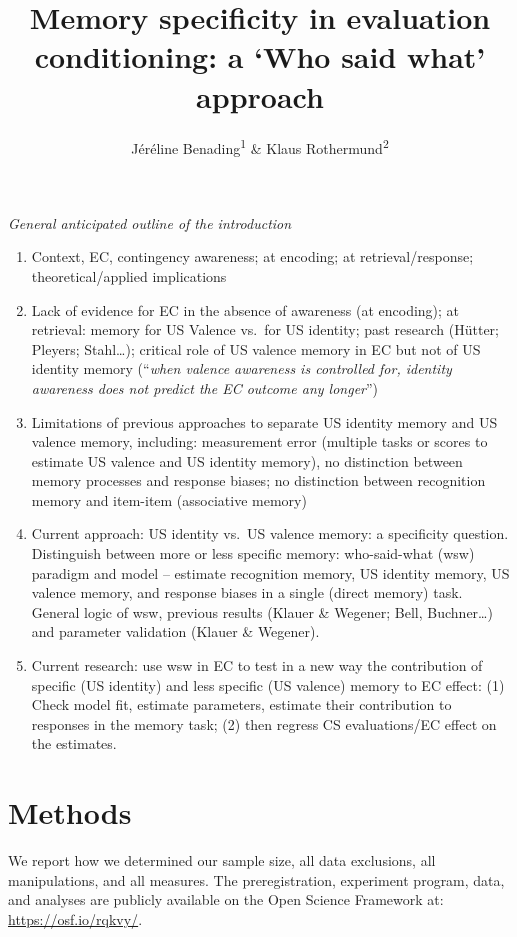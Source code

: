 \documentclass[
  man,floatsintext]{apa6}
\title{Memory specificity in evaluation conditioning: a `Who said what' approach}
\author{Jéréline Benading\textsuperscript{1} \& Klaus Rothermund\textsuperscript{2}}
\date{}
\affiliation{\vspace{0.5cm}\textsuperscript{1} Université Agnostique de Louvain-la-Jena\\\textsuperscript{2} Friedrich Schiller University Jena}
\begin{document}
\maketitle

\emph{General anticipated outline of the introduction}

\begin{enumerate}
\def\labelenumi{\arabic{enumi}.}
\item
  Context, EC, contingency awareness; at encoding; at retrieval/response; theoretical/applied implications
\item
  Lack of evidence for EC in the absence of awareness (at encoding); at retrieval: memory for US Valence vs.~for US identity; past research (Hütter; Pleyers; Stahl\ldots); critical role of US valence memory in EC but not of US identity memory (``\emph{when valence awareness is controlled for, identity awareness does not predict the EC outcome any longer}'')
\item
  Limitations of previous approaches to separate US identity memory and US valence memory, including: measurement error (multiple tasks or scores to estimate US valence and US identity memory), no distinction between memory processes and response biases; no distinction between recognition memory and item-item (associative memory)
\item
  Current approach: US identity vs.~US valence memory: a specificity question. Distinguish between more or less specific memory: who-said-what (wsw) paradigm and model -- estimate recognition memory, US identity memory, US valence memory, and response biases in a single (direct memory) task. General logic of wsw, previous results (Klauer \& Wegener; Bell, Buchner\ldots) and parameter validation (Klauer \& Wegener).
\item
  Current research: use wsw in EC to test in a new way the contribution of specific (US identity) and less specific (US valence) memory to EC effect: (1) Check model fit, estimate parameters, estimate their contribution to responses in the memory task; (2) then regress CS evaluations/EC effect on the estimates.
\end{enumerate}

\hypertarget{methods}{%
\section{Methods}\label{methods}}

We report how we determined our sample size, all data exclusions, all manipulations, and all measures. The preregistration, experiment program, data, and analyses are publicly available on the Open Science Framework at: \url{https://osf.io/rqkvy/}.
\end{document}
